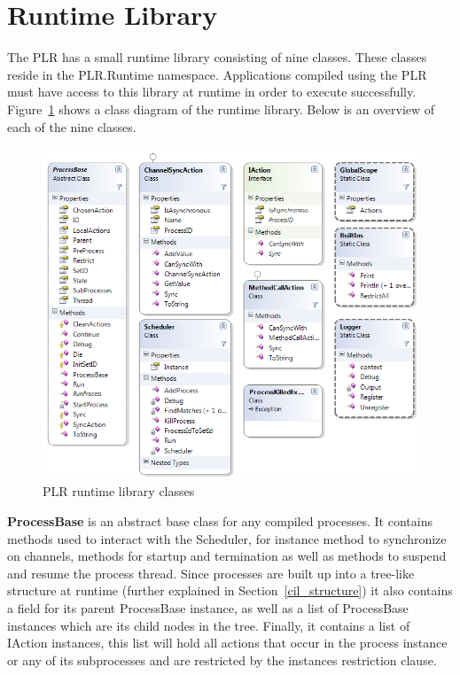 	
\section{Runtime Library}

	The PLR has a small runtime library consisting of nine classes. These classes
	reside in the \textsf{PLR.Runtime} namespace. Applications compiled using 
	the PLR must have access to this library at runtime in order to execute 
	successfully. Figure~\ref{fig:runtime_library} shows a class diagram of the 
	runtime library. Below is an overview of each of the nine classes.

	\begin{figure}[h!]
		\centering
		\includegraphics[scale=0.5]{RuntimeLibrary.png}
		\caption{PLR runtime library classes}
		\label{fig:runtime_library}
	\end{figure}

	\textbf{ProcessBase} is an abstract base class for any compiled processes.
	It contains methods used to interact with the \textsf{Scheduler},
	for instance method to synchronize on channels, methods for startup and
	termination as well as methods to suspend and resume the process thread.
	Since processes are built up into a tree-like structure at runtime (further 
	explained in Section~\ref{cil_structure}) it also contains a field for its 
	parent \textsf{ProcessBase} instance, as well as a list of 
	\textsf{ProcessBase} instances which are its child nodes in the tree. 
	Finally, it contains a list of \textsf{IAction} instances, this list will 
	hold all actions that occur in the process instance or any of its 
	subprocesses and are restricted by the instances restriction clause.
	
